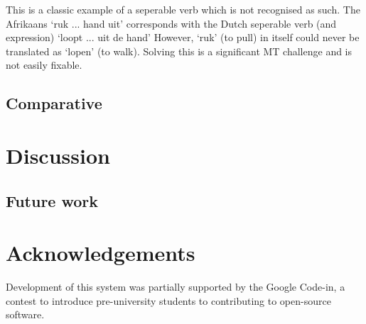 \documentclass[11pt]{article}
\newcommand{\confname}{EAMT 2011}
\begin{document}
This is a classic example of a seperable verb which is not recognised as such. The Afrikaans `ruk ... hand uit' corresponds with
 the Dutch seperable verb (and expression) `loopt ... uit de hand' However, `ruk' (to pull) in itself could never be translated as `lopen' (to walk). 
Solving this is a significant MT challenge and is not easily fixable.  

\subsection{Comparative}



\section{Discussion}

\subsection{Future work}

\section*{Acknowledgements}

Development of this system was partially supported by the Google Code-in,
a contest to introduce pre-university students to contributing to open-source
software.

% 
\end{document}
